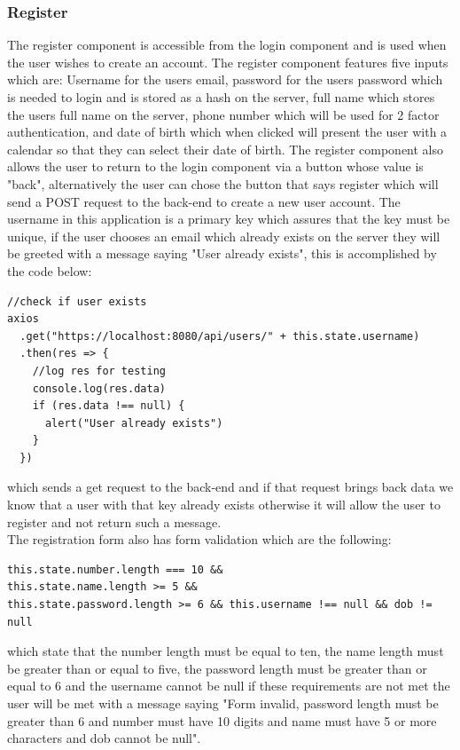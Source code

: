 \subsubsection{Register}
The register component is accessible from the login component and is used when the
user wishes to create an account.  The register component features five inputs which
are: Username for the users email, password for the users password which is needed to login and is stored as a hash on the server,
full name which stores the users full name on the server, phone number which will be used for
2 factor authentication, and date of birth which when clicked will present the user with a calendar
so that they can select their date of birth.  The register component also allows the user to return
to the login component via a button whose value is "back", alternatively the user can chose the button that
says register which will send a POST request to the back-end to create a new user account.  The username
in this application is a primary key which assures that the key must be unique, if the user chooses an
email which already exists on the server they will be greeted with a message saying "User already exists",
this is accomplished by the code below:
\begin{verbatim}
//check if user exists
axios
  .get("https://localhost:8080/api/users/" + this.state.username)
  .then(res => {
    //log res for testing
    console.log(res.data)
    if (res.data !== null) {
      alert("User already exists")
    }
  })
\end{verbatim}
which sends a get request to the back-end and if that request brings back data we know that a
user with that key already exists otherwise it will allow the user to register and not return such
a message.
\\
The registration form also has form validation which are the following:
\begin{verbatim}
this.state.number.length === 10 &&
this.state.name.length >= 5 &&
this.state.password.length >= 6 && this.username !== null && dob != null
\end{verbatim}
which state that the number length must be equal to ten, the name length must be greater than or equal to five, the password length must be greater than or equal to 6 and the username cannot be null if these requirements are not met the user will be met with a message saying "Form invalid, password length must be greater than 6 and number must have 10 digits and  name must have 5 or more characters and dob cannot be null".
